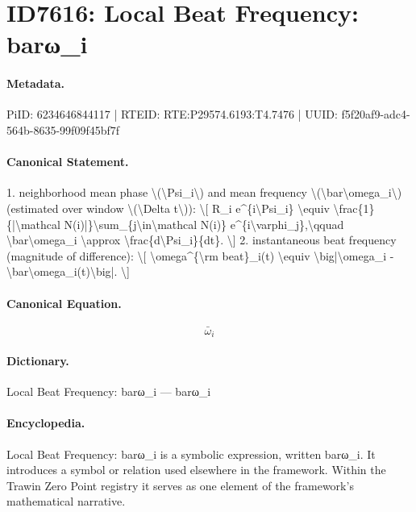 \section*{ID7616: Local Beat Frequency: barω\_i}
\paragraph{Metadata.}
PiID: 6234646844117 | RTEID: RTE:P29574.6193:T4.7476 | UUID: f5f20af9-adc4-564b-8635-99f09f45bf7f

\paragraph{Canonical Statement.}
1. neighborhood mean phase \textbackslash{}(\textbackslash{}Psi\_i\textbackslash{}) and mean frequency \textbackslash{}(\textbackslash{}bar\textbackslash{}omega\_i\textbackslash{}) (estimated over window \textbackslash{}(\textbackslash{}Delta t\textbackslash{})): \textbackslash{}[ R\_i e\textasciicircum{}\{i\textbackslash{}Psi\_i\} \textbackslash{}equiv \textbackslash{}frac\{1\}\{|\textbackslash{}mathcal N(i)|\}\textbackslash{}sum\_\{j\textbackslash{}in\textbackslash{}mathcal N(i)\} e\textasciicircum{}\{i\textbackslash{}varphi\_j\},\textbackslash{}qquad \textbackslash{}bar\textbackslash{}omega\_i \textbackslash{}approx \textbackslash{}frac\{d\textbackslash{}Psi\_i\}\{dt\}. \textbackslash{}] 2. instantaneous beat frequency (magnitude of difference): \textbackslash{}[ \textbackslash{}omega\textasciicircum{}\{\textbackslash{}rm beat\}\_i(t) \textbackslash{}equiv \textbackslash{}big|\textbackslash{}omega\_i - \textbackslash{}bar\textbackslash{}omega\_i(t)\textbackslash{}big|. \textbackslash{}]

\paragraph{Canonical Equation.}
\[
\bar\omega_i
\]

\paragraph{Dictionary.}
Local Beat Frequency: barω\_i — barω\_i

\paragraph{Encyclopedia.}
Local Beat Frequency: barω\_i is a symbolic expression, written barω\_i. It introduces a symbol or relation used elsewhere in the framework. Within the Trawin Zero Point registry it serves as one element of the framework's mathematical narrative.
